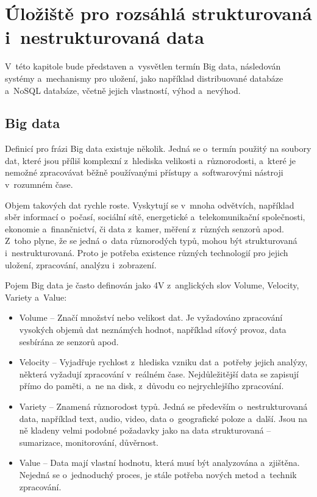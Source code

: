 \chapter{Úložiště pro rozsáhlá strukturovaná i~nestrukturovaná data} \label{chapter2}
V~této kapitole bude představen a~vysvětlen termín Big data, následován systémy a~mechanismy pro uložení, jako například distribuované databáze a~NoSQL databáze, včetně jejich vlastností, výhod a~nevýhod.

\section{Big data} \label{bigDataSection}
Definicí pro frázi Big data existuje několik. Jedná se o~termín použitý na soubory dat, které jsou příliš komplexní z~hlediska velikosti a~různorodosti, a~které je nemožné zpracovávat běžně používanými přístupy a~softwarovými nástroji v~rozumném čase.

Objem takových dat rychle roste. Vyskytují se v~mnoha odvětvích, například sběr informací o~počasí, sociální sítě, energetické a~telekomunikační společnosti, ekonomie a~finančnictví, či data z~kamer, měření z~různých senzorů apod. Z~toho plyne, že se jedná o~data různorodých typů, mohou být strukturovaná i~nestrukturovaná. Proto je potřeba existence různých technologií pro jejich uložení, zpracování, analýzu i~zobrazení.


\vspace{0.5cm}

\noindent Pojem Big data je často definován jako 4V z~anglických slov Volume, Velocity, Variety a~Value: \cite{oracleBigData}

\begin{itemize}
\item Volume – Značí množství nebo velikost dat. Je vyžadováno zpracování vysokých objemů dat neznámých hodnot, například síťový provoz, data sesbírána ze senzorů apod.

\item Velocity – Vyjadřuje rychlost z~hlediska vzniku dat a~potřeby jejich analýzy, některá vyžadují zpracování v~reálném čase. Nejdůležitější data se zapisují přímo do paměti, a~ne na disk, z~důvodu co nejrychlejšího zpracování.

\item Variety – Znamená různorodost typů. Jedná se především o~nestrukturovaná data, například text, audio, video, data o~geografické poloze a~další. Jsou na ně kladeny velmi podobné požadavky jako na data strukturovaná – sumarizace, monitorování, důvěrnost. \cite{oracleBigData}

\item Value – Data mají vlastní hodnotu, která musí být analyzována a~zjištěna. Nejedná se o~jednoduchý proces, je stále potřeba nových metod a~technik zpracování.
\end{itemize}

